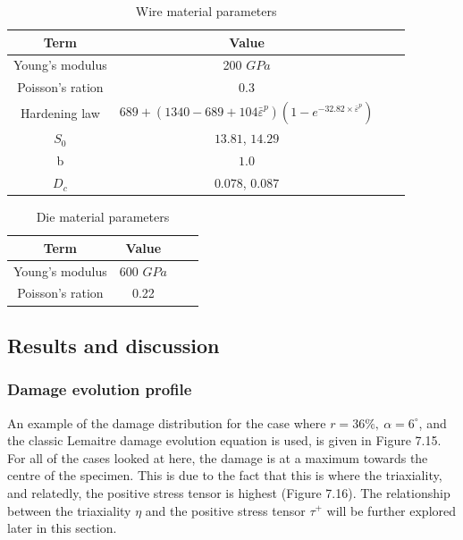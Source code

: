 \documentclass[sn-mathphys,Numbered,draft]{sn-jnl}%
\begin{document}
\begin{table}[htb]
	\centering
		\begin{tabular}{cccc} \hline
			Term  & Value  \\ \hline 
            Young's modulus & 200 $GPa$ \\
			Poisson's ration & 0.3  \\
   		Hardening law & $689+(1340-689+104\bar{\varepsilon}^p)(1-e^{-32.82\times\bar{\varepsilon}^p})$ &  \\
        	$S_0$ & $13.81$, $14.29$ \\
        	b & $1.0$  \\
            $D_c$ & $0.078$, $0.087$  \\
			\hline
		\end{tabular}
	\caption{Wire material parameters}
	\label{tab:material_properties}
\end{table}

\begin{table}[htb]
	\centering
		\begin{tabular}{cccc} \hline
			Term  & Value  \\ \hline 
            Young's modulus & 600 $GPa$ \\
			Poisson's ration & 0.22  \\
			\hline
		\end{tabular}
	\caption{Die material parameters}
	\label{tab:material_properties}
\end{table}
\FloatBarrier

\subsection{Results and discussion}

\subsubsection{Damage evolution profile}


An example of the damage distribution for the case where $r=36\%,\ \alpha=6^{\circ}$, and the classic Lemaitre damage evolution equation is used, is given in Figure 7.15. For all of the cases looked at here, the damage is at a maximum towards the centre of the specimen. This is due to the fact that this is where the triaxiality, and relatedly, the positive stress tensor is highest (Figure 7.16). The relationship between the triaxiality $\eta$ and the positive stress tensor $\tau^+$ will be further explored later in this section.
\end{document}
